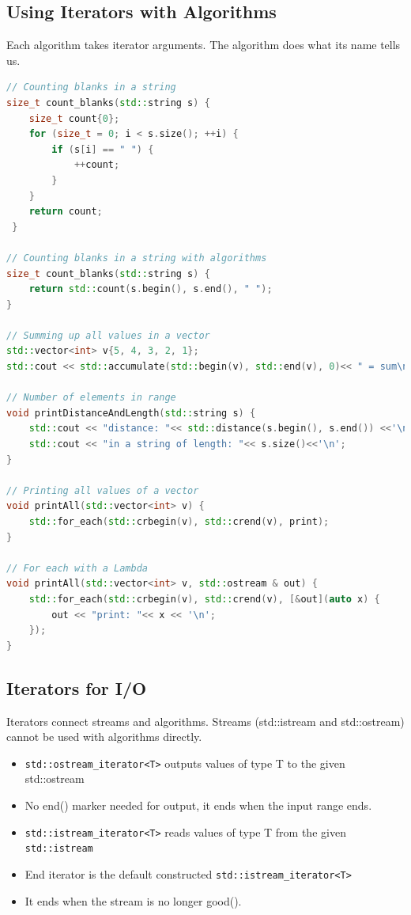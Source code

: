 \subsection{Using Iterators with Algorithms}
 Each algorithm takes iterator arguments. The algorithm does what its name tells us. 
 
\begin{lstlisting}[language=C++]
// Counting blanks in a string
size_t count_blanks(std::string s) {
 	size_t count{0};
 	for (size_t = 0; i < s.size(); ++i) {
 		if (s[i] == " ") {
 			++count;
 		}
 	}
 	return count;
 }
 
// Counting blanks in a string with algorithms
size_t count_blanks(std::string s) {
	return std::count(s.begin(), s.end(), " ");
}

// Summing up all values in a vector
std::vector<int> v{5, 4, 3, 2, 1}; 
std::cout << std::accumulate(std::begin(v), std::end(v), 0)<< " = sum\n";

// Number of elements in range 
void printDistanceAndLength(std::string s) {
	std::cout << "distance: "<< std::distance(s.begin(), s.end()) <<'\n';
	std::cout << "in a string of length: "<< s.size()<<'\n'; 
} 	

// Printing all values of a vector
void printAll(std::vector<int> v) {
	std::for_each(std::crbegin(v), std::crend(v), print); 
}

// For each with a Lambda
void printAll(std::vector<int> v, std::ostream & out) {
	std::for_each(std::crbegin(v), std::crend(v), [&out](auto x) {
		out << "print: "<< x << '\n';
	});
}

\end{lstlisting}


\subsection{Iterators for I/O}
Iterators connect streams and algorithms.  Streams (std::istream and std::ostream) cannot be used with algorithms directly.

\begin{itemize}
	\itemsep -0.5em 
  	\item \lstinline{std::ostream_iterator<T>} outputs values of type T to the given std::ostream
  	\item No end() marker needed for output, it ends when the input range ends.
  	\item \lstinline|std::istream_iterator<T>| reads values of type T from the given \lstinline|std::istream|
  	\item End iterator is the default constructed \lstinline|std::istream_iterator<T>|
   	\item It ends when the stream is no longer good().
\end{itemize}

